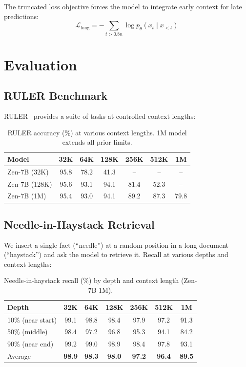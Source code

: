 \documentclass[11pt,a4paper]{article}
\begin{document}
The truncated loss objective forces the model to integrate early context for
late predictions:
\begin{equation}
\mathcal{L}_\text{long} = -\sum_{t > 0.8n} \log p_\theta(x_t \mid x_{<t})
\end{equation}

\section{Evaluation}

\subsection{RULER Benchmark}

RULER~\cite{hsieh2024ruler} provides a suite of tasks at controlled context lengths:

\begin{table}[H]
\centering
\begin{tabular}{lcccccc}
\toprule
\textbf{Model} & \textbf{32K} & \textbf{64K} & \textbf{128K} & \textbf{256K} & \textbf{512K} & \textbf{1M} \\
\midrule
Zen-7B (32K) & 95.8 & 78.2 & 41.3 & -- & -- & -- \\
Zen-7B (128K) & 95.6 & 93.1 & 94.1 & 81.4 & 52.3 & -- \\
Zen-7B (1M) & 95.4 & 93.0 & 94.1 & 89.2 & 87.3 & 79.8 \\
\bottomrule
\end{tabular}
\caption{RULER accuracy (\%) at various context lengths. 1M model extends all prior limits.}
\end{table}

\subsection{Needle-in-Haystack Retrieval}

We insert a single fact (``needle'') at a random position in a long document (``haystack'')
and ask the model to retrieve it. Recall at various depths and context lengths:

\begin{table}[H]
\centering
\begin{tabular}{lcccccc}
\toprule
\textbf{Depth} & \textbf{32K} & \textbf{64K} & \textbf{128K} & \textbf{256K} & \textbf{512K} & \textbf{1M} \\
\midrule
10\% (near start) & 99.1 & 98.8 & 98.4 & 97.9 & 97.2 & 91.3 \\
50\% (middle) & 98.4 & 97.2 & 96.8 & 95.3 & 94.1 & 84.2 \\
90\% (near end) & 99.2 & 99.0 & 98.9 & 98.4 & 97.8 & 93.1 \\
\midrule
Average & \textbf{98.9} & \textbf{98.3} & \textbf{98.0} & \textbf{97.2} & \textbf{96.4} & \textbf{89.5} \\
\bottomrule
\end{tabular}
\caption{Needle-in-haystack recall (\%) by depth and context length (Zen-7B 1M).}
\end{table}
\end{document}
